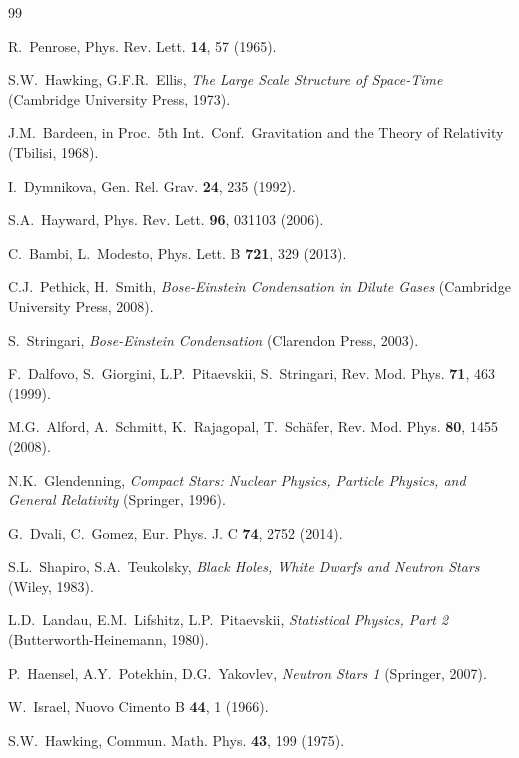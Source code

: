 \documentclass[epj]{svjour}
\begin{document}
\begin{thebibliography}{99}

R.~Penrose, Phys. Rev. Lett. \textbf{14}, 57 (1965).

S.W.~Hawking, G.F.R.~Ellis, \emph{The Large Scale Structure of Space-Time} (Cambridge University Press, 1973).

J.M.~Bardeen, in Proc.\ 5th Int.\ Conf.\ Gravitation and the Theory of Relativity (Tbilisi, 1968).

I.~Dymnikova, Gen. Rel. Grav. \textbf{24}, 235 (1992).

S.A.~Hayward, Phys. Rev. Lett. \textbf{96}, 031103 (2006).

C.~Bambi, L.~Modesto, Phys. Lett. B \textbf{721}, 329 (2013).

C.J.~Pethick, H.~Smith, \emph{Bose-Einstein Condensation in Dilute Gases} (Cambridge University Press, 2008).

S.~Stringari, \emph{Bose-Einstein Condensation} (Clarendon Press, 2003).

F.~Dalfovo, S.~Giorgini, L.P.~Pitaevskii, S.~Stringari, Rev. Mod. Phys. \textbf{71}, 463 (1999).

M.G.~Alford, A.~Schmitt, K.~Rajagopal, T.~Sch\"afer, Rev. Mod. Phys. \textbf{80}, 1455 (2008).

N.K.~Glendenning, \emph{Compact Stars: Nuclear Physics, Particle Physics, and General Relativity} (Springer, 1996).

G.~Dvali, C.~Gomez, Eur. Phys. J. C \textbf{74}, 2752 (2014).

S.L.~Shapiro, S.A.~Teukolsky, \emph{Black Holes, White Dwarfs and Neutron Stars} (Wiley, 1983).

L.D.~Landau, E.M.~Lifshitz, L.P.~Pitaevskii, \emph{Statistical Physics, Part 2} (Butterworth-Heinemann, 1980).

P.~Haensel, A.Y.~Potekhin, D.G.~Yakovlev, \emph{Neutron Stars 1} (Springer, 2007).

W.~Israel, Nuovo Cimento B \textbf{44}, 1 (1966).

S.W.~Hawking, Commun. Math. Phys. \textbf{43}, 199 (1975).


\end{thebibliography}
\end{document}

